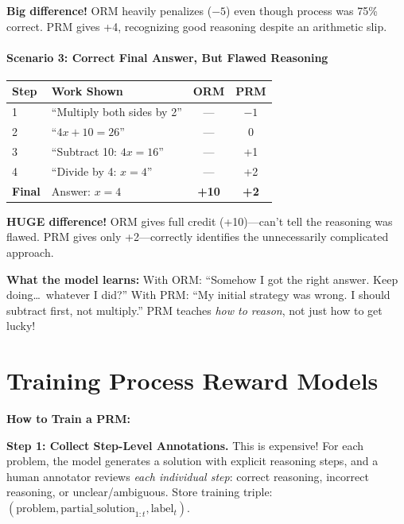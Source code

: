 \begin{chapterenv}
\textbf{Big difference!} ORM heavily penalizes ($-5$) even though process was 75\% correct. PRM gives +4, recognizing good reasoning despite an arithmetic slip.

\paragraph{Scenario 3: Correct Final Answer, But Flawed Reasoning}

\begin{center}
\begin{tabular}{lp{4.5cm}cc}
\toprule
\textbf{Step} & \textbf{Work Shown} & \textbf{ORM} & \textbf{PRM} \\
\midrule
1 & ``Multiply both sides by 2'' & --- & $-1$ \\
2 & ``$4x + 10 = 26$'' & --- & 0 \\
3 & ``Subtract 10: $4x = 16$'' & --- & +1 \\
4 & ``Divide by 4: $x = 4$'' & --- & +2 \\
\midrule
\textbf{Final} & Answer: $x = 4$ & \textbf{+10} & \textbf{+2} \\
\bottomrule
\end{tabular}
\end{center}

\textbf{HUGE difference!} ORM gives full credit (+10)---can't tell the reasoning was flawed. PRM gives only +2---correctly identifies the unnecessarily complicated approach.

\textbf{What the model learns:} With ORM: ``Somehow I got the right answer. Keep doing\ldots\ whatever I did?'' With PRM: ``My initial strategy was wrong. I should subtract first, not multiply.'' PRM teaches \textit{how to reason}, not just how to get lucky!

\section{Training Process Reward Models}

\begin{infobox}
\textbf{How to Train a PRM:}

\textbf{Step 1: Collect Step-Level Annotations.} This is expensive! For each problem, the model generates a solution with explicit reasoning steps, and a human annotator reviews \textit{each individual step}: correct reasoning, incorrect reasoning, or unclear/ambiguous. Store training triple: $(\text{problem}, \text{partial\_solution}_{1:t}, \text{label}_t)$.


\end{infobox}
\end{chapterenv}
